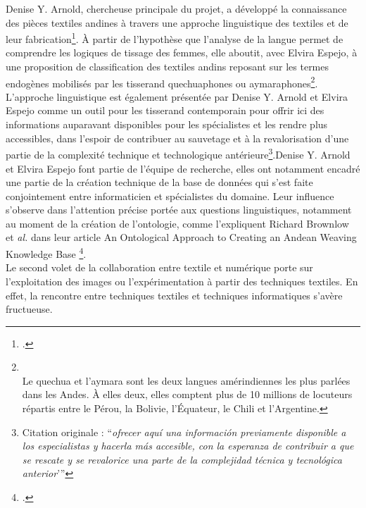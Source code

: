 Denise Y. Arnold, chercheuse principale du projet, a développé la connaissance des pièces textiles andines à travers une approche linguistique des textiles et de leur fabrication\footcite{arnoldHaciaTerminologiaAndina2011}. À partir de l'hypothèse que l'analyse de la langue permet de comprendre les logiques de tissage des femmes, elle aboutit, avec Elvira Espejo, à une proposition de classification des textiles andins reposant sur les termes endogènes mobilisés par les tisserand quechuaphones ou aymaraphones\footnote{\cite{arnoldCienciaTejerAndes2019} \\ Le quechua et l'aymara sont les deux langues amérindiennes les plus parlées dans les Andes. À elles deux, elles comptent plus de 10 millions de locuteurs répartis entre le Pérou, la Bolivie, l'Équateur, le Chili et l'Argentine.}. L'approche linguistique est également présentée par Denise Y. Arnold et Elvira Espejo comme un outil pour les tisserand contemporain pour \og offrir ici des informations auparavant disponibles pour les spécialistes et les rendre plus accessibles, dans l'espoir de contribuer au sauvetage et à la revalorisation d'une partie de la complexité technique et technologique antérieure\footnote{\cite[p.~8]{arnoldCienciaTejerAndes2019} Citation originale : \textquotedblleft \textit{ofrecer aquí una información previamente disponible a los especialistas y hacerla más accesible, con la esperanza de contribuir a que se rescate y se revalorice una parte de la complejidad técnica y tecnológica anterior}'\textquotedblright}.\fg \:Denise Y. Arnold et Elvira Espejo font partie de l'équipe de recherche, elles ont notamment encadré une partie de la création technique de la base de données qui s'est faite conjointement entre informaticien et spécialistes du domaine. Leur influence s'observe dans l'attention précise portée aux questions linguistiques, notamment au moment de la création de l'ontologie, comme l'expliquent Richard Brownlow et \textit{al.} dans leur article \og An Ontological Approach to Creating an Andean Weaving Knowledge Base \fg\footcite{brownlowOntologicalApproachCreating2015}.\\

Le second volet de la collaboration entre textile et numérique porte sur l'exploitation des images ou l'expérimentation à partir des techniques textiles. En effet, la rencontre entre techniques textiles et techniques informatiques s'avère fructueuse.

